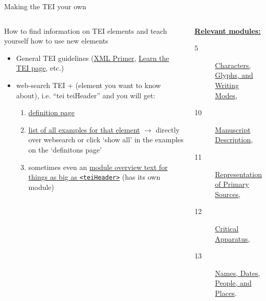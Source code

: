 \begin{frame}{Making the TEI your own}
\small
{}
\begin{columns}
    \begin{block}{How to find information on TEI elements and teach yourself how to use new elements}
\begin{itemize}
    \item General TEI guidelines (\href{https://tei-c.org/release/doc/tei-p5-doc/en/html/SG.html}{XML Primer}, \href{https://tei-c.org/support/learn/}{Learn the TEI page}, etc.)
    \item web-search TEI + (element you want to know about), i.e. ``tei teiHeader'' and you will get:
    \begin{enumerate}\footnotesize
        \item \href{https://www.tei-c.org/release/doc/tei-p5-doc/en/html/ref-teiHeader.html}{definition page}
        \item \href{https://www.tei-c.org/release/doc/tei-p5-doc/en/html/examples-teiHeader.html}{list of all examples for that element} $\to$ directly over websearch or click `show all' in the examples on the `definitons page'
        \item sometimes even an \href{https://www.tei-c.org/release/doc/tei-p5-doc/en/html/HD.html}{module overview text for things as big as \texttt{<teiHeader>}} (has its own module)
    \end{enumerate}
\end{itemize}
    \end{block}

\begin{block}{\href{https://tei-c.org/release/doc/tei-p5-doc/en/html/index.html}{\textbf{Relevant modules:}}}\footnotesize
\begin{description}
     \item[5] \href{https://tei-c.org/release/doc/tei-p5-doc/en/html/WD.html}{Characters, Glyphs, and Writing Modes}, 
     \item[10] \href{https://www.tei-c.org/release/doc/tei-p5-doc/en/html/MS.html}{Manuscript Description},
     \item[11] \href{https://tei-c.org/release/doc/tei-p5-doc/en/html/PH.html}{Representation of Primary Sources},
     \item[12] \href{https://tei-c.org/release/doc/tei-p5-doc/en/html/TC.html}{Critical Apparatus},
     \item[13] \href{https://tei-c.org/release/doc/tei-p5-doc/en/html/ND.html}{Names, Dates, People, and Places}.
\end{description}


\end{block}
\end{columns}
\end{frame}
